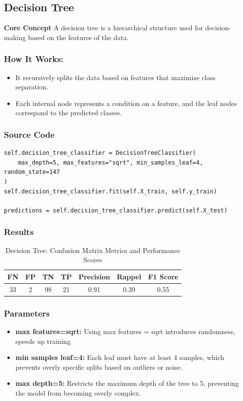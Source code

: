 \documentclass[a4paper,12pt]{article}
\begin{document}
\subsection{Decision Tree}
\textbf{Core Concept} A decision tree is a hierarchical structure used for decision-making based on the features of the data.
\subsubsection*{How It Works:}
\begin{itemize}
    \item It recursively splits the data based on features that maximize class separation.
    \item Each internal node represents a condition on a feature, and the leaf nodes correspond to the predicted classes.
\end{itemize}

\subsubsection*{Source Code}
\begin{lstlisting}[style=python]
self.decision_tree_classifier = DecisionTreeClassifier(
    max_depth=5, max_features="sqrt", min_samples_leaf=4, random_state=147
)
self.decision_tree_classifier.fit(self.X_train, self.y_train)

predictions = self.decision_tree_classifier.predict(self.X_test)
\end{lstlisting}

\subsubsection*{Results}
\begin{table}[h!]
\centering
\begin{tabular}{|c|c|c|c|c|c|c|}
\hline
\textbf{FN} & \textbf{FP} & \textbf{TN} & \textbf{TP} & \textbf{Precision} & \textbf{Rappel} & \textbf{F1 Score} \\ \hline
33          & 2           & 98          & 21          & 0.91               & 0.39            & 0.55              \\ \hline
\end{tabular}
\caption{Decision Tree: Confusion Matrix Metrics and Performance Scores}
\end{table}

\subsubsection*{Parameters}
\begin{itemize}
    \item \textbf{max features=sqrt: } Using max features = sqrt introduces randomness, speeds up training
    \item \textbf{min samples leaf=4: } Each leaf must have at least 4 samples, which prevents overly specific splits based on outliers or noise.
    \item \textbf{max depth=5: } Restricts the maximum depth of the tree to 5, preventing the model from becoming overly complex.
\end{itemize}
\end{document}
